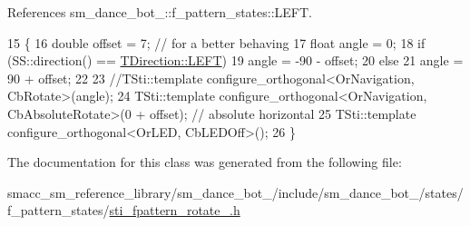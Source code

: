 References sm\+\_\+dance\+\_\+bot\+\_\+::f\+\_\+pattern\+\_\+states\+::\+L\+E\+FT.


\begin{DoxyCode}
15   \{
16     \textcolor{keywordtype}{double} offset = 7; \textcolor{comment}{// for a better behaving}
17     \textcolor{keywordtype}{float} angle = 0;
18     \textcolor{keywordflow}{if} (SS::direction() == \hyperlink{namespacesm__dance__bot__3_1_1f__pattern__states_a83147bb244b48451a16ce27e543c8157a684d325a7303f52e64011467ff5c5758}{TDirection::LEFT})
19       angle = -90 - offset;
20     \textcolor{keywordflow}{else}
21       angle = 90 + offset;
22 
23     \textcolor{comment}{//TSti::template configure\_orthogonal<OrNavigation, CbRotate>(angle);}
24     TSti::template configure\_orthogonal<OrNavigation, CbAbsoluteRotate>(0 + offset); \textcolor{comment}{// absolute horizontal}
25     TSti::template configure\_orthogonal<OrLED, CbLEDOff>();
26   \}
\end{DoxyCode}


The documentation for this class was generated from the following file\+:\begin{DoxyCompactItemize}
\item 
smacc\+\_\+sm\+\_\+reference\+\_\+library/sm\+\_\+dance\+\_\+bot\+\_/include/sm\+\_\+dance\+\_\+bot\+\_/states/f\+\_\+pattern\+\_\+states/\hyperlink{3_2include_2sm__dance__bot__3_2states_2f__pattern__states_2sti__fpattern__rotate__2_8h}{sti\+\_\+fpattern\+\_\+rotate\+\_.\+h}\end{DoxyCompactItemize}
